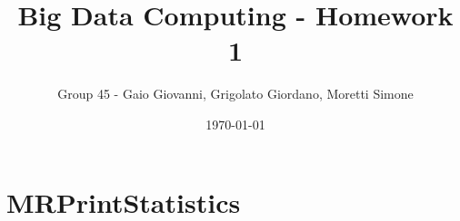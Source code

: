 \documentclass{article}
\title{Big Data Computing - Homework 1}
\author{Group 45 - Gaio Giovanni, Grigolato Giordano, Moretti Simone}
\date{\today}
\begin{document}
\maketitle    
\section{MRPrintStatistics}
\end{document}

